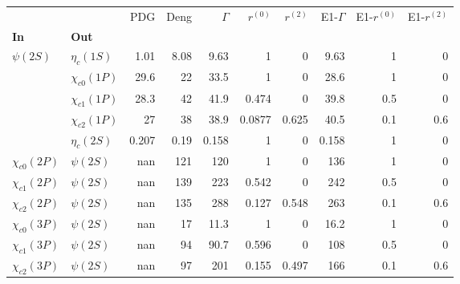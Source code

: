 \begin{tabular}{l|l|r|r|r|r|r|r|r|r}
\toprule
                &            &   PDG &  Deng &  $\Gamma$ &  $r^{(0)}$ &  $r^{(2)}$ &  E1-$\Gamma$ &  E1-$r^{(0)}$ &  E1-$r^{(2)}$ \\
\textbf{In} & \textbf{Out} &       &       &           &            &            &              &               &               \\
\midrule
\textbf{$\psi(2S)$} & \textbf{$\eta_{c}(1S)$} &  1.01 &  8.08 &      9.63 &          1 &          0 &         9.63 &             1 &             0 \\
                & \textbf{$\chi_{c0}(1P)$} &  29.6 &    22 &      33.5 &          1 &          0 &         28.6 &             1 &             0 \\
                & \textbf{$\chi_{c1}(1P)$} &  28.3 &    42 &      41.9 &      0.474 &          0 &         39.8 &           0.5 &             0 \\
                & \textbf{$\chi_{c2}(1P)$} &    27 &    38 &      38.9 &     0.0877 &      0.625 &         40.5 &           0.1 &           0.6 \\
                & \textbf{$\eta_{c}(2S)$} & 0.207 &  0.19 &     0.158 &          1 &          0 &        0.158 &             1 &             0 \\
\textbf{$\chi_{c0}(2P)$} & \textbf{$\psi(2S)$} &   nan &   121 &       120 &          1 &          0 &          136 &             1 &             0 \\
\textbf{$\chi_{c1}(2P)$} & \textbf{$\psi(2S)$} &   nan &   139 &       223 &      0.542 &          0 &          242 &           0.5 &             0 \\
\textbf{$\chi_{c2}(2P)$} & \textbf{$\psi(2S)$} &   nan &   135 &       288 &      0.127 &      0.548 &          263 &           0.1 &           0.6 \\
\textbf{$\chi_{c0}(3P)$} & \textbf{$\psi(2S)$} &   nan &    17 &      11.3 &          1 &          0 &         16.2 &             1 &             0 \\
\textbf{$\chi_{c1}(3P)$} & \textbf{$\psi(2S)$} &   nan &    94 &      90.7 &      0.596 &          0 &          108 &           0.5 &             0 \\
\textbf{$\chi_{c2}(3P)$} & \textbf{$\psi(2S)$} &   nan &    97 &       201 &      0.155 &      0.497 &          166 &           0.1 &           0.6 \\
\bottomrule
\end{tabular}
